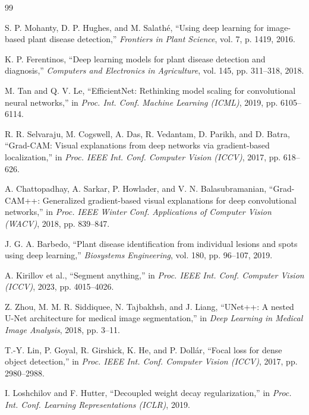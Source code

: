 \documentclass[10pt,a4paper]{article}
\begin{document}
\begin{thebibliography}{99}

S. P. Mohanty, D. P. Hughes, and M. Salath\'{e}, ``Using deep learning for image-based plant disease detection,'' \textit{Frontiers in Plant Science}, vol. 7, p. 1419, 2016.

K. P. Ferentinos, ``Deep learning models for plant disease detection and diagnosis,'' \textit{Computers and Electronics in Agriculture}, vol. 145, pp. 311--318, 2018.

M. Tan and Q. V. Le, ``EfficientNet: Rethinking model scaling for convolutional neural networks,'' in \textit{Proc. Int. Conf. Machine Learning (ICML)}, 2019, pp. 6105--6114.

R. R. Selvaraju, M. Cogswell, A. Das, R. Vedantam, D. Parikh, and D. Batra, ``Grad-CAM: Visual explanations from deep networks via gradient-based localization,'' in \textit{Proc. IEEE Int. Conf. Computer Vision (ICCV)}, 2017, pp. 618--626.

A. Chattopadhay, A. Sarkar, P. Howlader, and V. N. Balasubramanian, ``Grad-CAM++: Generalized gradient-based visual explanations for deep convolutional networks,'' in \textit{Proc. IEEE Winter Conf. Applications of Computer Vision (WACV)}, 2018, pp. 839--847.

J. G. A. Barbedo, ``Plant disease identification from individual lesions and spots using deep learning,'' \textit{Biosystems Engineering}, vol. 180, pp. 96--107, 2019.

A. Kirillov et al., ``Segment anything,'' in \textit{Proc. IEEE Int. Conf. Computer Vision (ICCV)}, 2023, pp. 4015--4026.

Z. Zhou, M. M. R. Siddiquee, N. Tajbakhsh, and J. Liang, ``UNet++: A nested U-Net architecture for medical image segmentation,'' in \textit{Deep Learning in Medical Image Analysis}, 2018, pp. 3--11.

T.-Y. Lin, P. Goyal, R. Girshick, K. He, and P. Doll\'{a}r, ``Focal loss for dense object detection,'' in \textit{Proc. IEEE Int. Conf. Computer Vision (ICCV)}, 2017, pp. 2980--2988.

I. Loshchilov and F. Hutter, ``Decoupled weight decay regularization,'' in \textit{Proc. Int. Conf. Learning Representations (ICLR)}, 2019.


\end{thebibliography}
\end{document}
